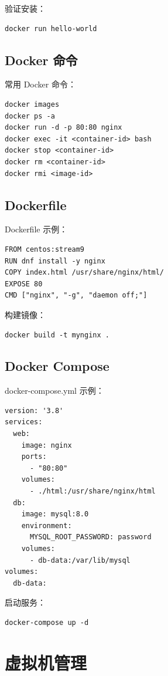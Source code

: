 \documentclass[12pt,UTF8]{ctexbook}
\begin{document}
验证安装：
\begin{verbatim}
docker run hello-world
\end{verbatim}

\section{Docker 命令}
\label{sec:docker_commands}

常用 Docker 命令：
\begin{verbatim}
docker images
docker ps -a
docker run -d -p 80:80 nginx
docker exec -it <container-id> bash
docker stop <container-id>
docker rm <container-id>
docker rmi <image-id>
\end{verbatim}

\section{Dockerfile}
\label{sec:dockerfile}

Dockerfile 示例：
\begin{verbatim}
FROM centos:stream9
RUN dnf install -y nginx
COPY index.html /usr/share/nginx/html/
EXPOSE 80
CMD ["nginx", "-g", "daemon off;"]
\end{verbatim}

构建镜像：
\begin{verbatim}
docker build -t mynginx .
\end{verbatim}

\section{Docker Compose}
\label{sec:docker_compose}

docker-compose.yml 示例：
\begin{verbatim}
version: '3.8'
services:
  web:
    image: nginx
    ports:
      - "80:80"
    volumes:
      - ./html:/usr/share/nginx/html
  db:
    image: mysql:8.0
    environment:
      MYSQL_ROOT_PASSWORD: password
    volumes:
      - db-data:/var/lib/mysql
volumes:
  db-data:
\end{verbatim}

启动服务：
\begin{verbatim}
docker-compose up -d
\end{verbatim}

\chapter{虚拟机管理}
\label{chap:vm_management}
\end{document}
